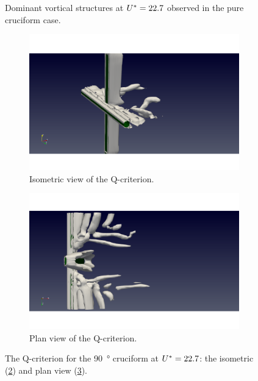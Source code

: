 \documentclass[oneside]{utmthesis}
\begin{document}
\begin{figure}
  \caption{Dominant vortical structures at $U^{*} = 22.7$ observed in the pure cruciform case.} \label{fig:vortStruct90}
\end{figure}

\begin{figure}
  \centering
  \begin{subfigure}[h]{0.9\textwidth}
    \includegraphics[width=\textwidth]{figs/qIso090U10}
    \caption{Isometric view of the Q-criterion.}
    \label{fig:qIso090U10}
  \end{subfigure}
  
  \begin{subfigure}[h]{0.9\textwidth}
    \includegraphics[width=\textwidth]{figs/qTop090U10}
    \caption{Plan view of the Q-criterion.}
    \label{fig:qTop090U10}
  \end{subfigure}

  \caption{The Q-criterion for the \SI{90}{\degree} cruciform at $U^{*} = 22.7$: the isometric (\ref{fig:qIso090U10}) and plan view (\ref{fig:qTop090U10}).} \label{fig:qCrit090U10}
\end{figure}
\end{document}
